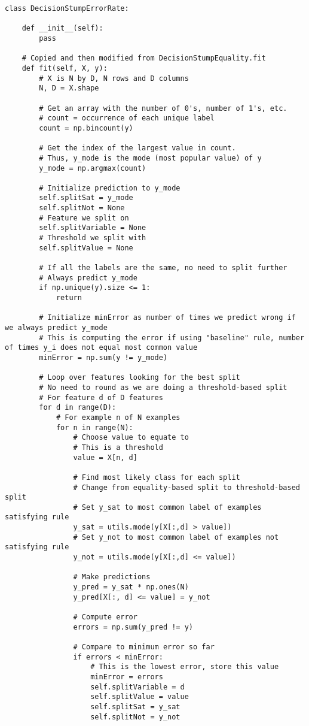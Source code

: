 \documentclass{article}
\begin{document}
\begin{lstlisting}
class DecisionStumpErrorRate:

    def __init__(self):
        pass

    # Copied and then modified from DecisionStumpEquality.fit
    def fit(self, X, y):
        # X is N by D, N rows and D columns
        N, D = X.shape

        # Get an array with the number of 0's, number of 1's, etc.
        # count = occurrence of each unique label
        count = np.bincount(y)
        
        # Get the index of the largest value in count.
        # Thus, y_mode is the mode (most popular value) of y
        y_mode = np.argmax(count)

        # Initialize prediction to y_mode
        self.splitSat = y_mode
        self.splitNot = None
        # Feature we split on
        self.splitVariable = None
        # Threshold we split with
        self.splitValue = None

        # If all the labels are the same, no need to split further
        # Always predict y_mode
        if np.unique(y).size <= 1:
            return

        # Initialize minError as number of times we predict wrong if we always predict y_mode
        # This is computing the error if using "baseline" rule, number of times y_i does not equal most common value
        minError = np.sum(y != y_mode)

        # Loop over features looking for the best split
        # No need to round as we are doing a threshold-based split
        # For feature d of D features
        for d in range(D):
            # For example n of N examples
            for n in range(N):
                # Choose value to equate to
                # This is a threshold
                value = X[n, d]

                # Find most likely class for each split
                # Change from equality-based split to threshold-based split
                # Set y_sat to most common label of examples satisfying rule
                y_sat = utils.mode(y[X[:,d] > value])
                # Set y_not to most common label of examples not satisfying rule
                y_not = utils.mode(y[X[:,d] <= value])

                # Make predictions
                y_pred = y_sat * np.ones(N)
                y_pred[X[:, d] <= value] = y_not

                # Compute error
                errors = np.sum(y_pred != y)

                # Compare to minimum error so far
                if errors < minError:
                    # This is the lowest error, store this value
                    minError = errors
                    self.splitVariable = d
                    self.splitValue = value
                    self.splitSat = y_sat
                    self.splitNot = y_not
\end{lstlisting}
\end{document}
